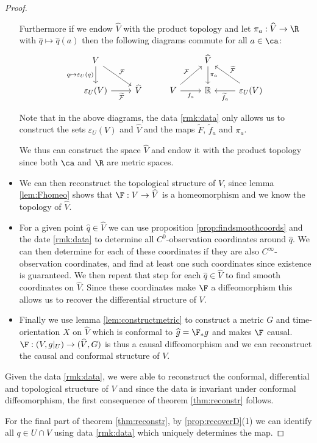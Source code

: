 \begin{proof}
\begin{itemize}
    Furthermore if we endow $\widehat{V}$ with the product topology and let $\pi_a:\widehat{V}\to \R$ with $\widehat{q}\mapsto \widehat{q}(a)$ then the following diagrams commute for all $a\in \ca$:
    \[\begin{tikzcd}
	V &&& {\widehat{V}} \\
	{\varepsilon_U(V)} & {\widehat{V}} & V & {\mathbb{R}} & {\varepsilon_U(V)}
	\arrow["{\mathcal{F}}", from=1-1, to=2-2]
	\arrow["{\widetilde{\mathcal{F}}}"', from=2-1, to=2-2]
	\arrow["{q\mapsto\varepsilon_U(q)}"', from=1-1, to=2-1]
	\arrow["{f_a}"', from=2-3, to=2-4]
	\arrow["{\widetilde{f}_a}", from=2-5, to=2-4]
	\arrow["{\mathcal{F}}", from=2-3, to=1-4]
	\arrow["{\widetilde{\mathcal{F}}}"', from=2-5, to=1-4]
	\arrow["{\pi_a}", from=1-4, to=2-4]
\end{tikzcd}\]

Note that in the above diagrams, the data \ref{rmk:data} only allows us to construct the sets $\varepsilon_U(V)$ and $\widehat{V}$ and the maps $\widetilde{F}$, $\widetilde{f}_a$ and $\pi_a$.

We thus can construct the space $\widehat{V}$ and endow it with the product topology since both $\ca$ and $\R$ are metric spaces.

\item We can then reconstruct the topological structure of $V$, since lemma \ref{lem:Fhomeo} shows that $\F:V\to\widehat{V}$ is a homeomorphism and we know the topology of $\widehat{V}$.

\item For a given point $\widehat{q}\in \widehat{V}$ we can use proposition \ref{prop:findsmoothcoords} and the date \ref{rmk:data} to determine all $C^0$-observation coordinates around $\widehat{q}$. We can then determine for each of these coordinates if they are also $C^\infty$-observation coordinates, and find at least one such coordinates since existence is guaranteed. We then repeat that step for each $\widehat{q}\in \widehat{V}$ to find smooth coordinates on $\widehat{V}$. Since these coordinates make $\F$ a diffeomorphism this allows us to recover the differential structure of $V$.

\item Finally we use lemma \ref{lem:constructmetric} to construct a metric $G$ and time-orientation $X$ on $\widehat{V}$ which is conformal to $\widehat{g}=\F_*g$ and makes $\F$ causal. 
$\F:(V,g\rvert_U)\to (\widehat{V},G)$ is thus a causal diffeomorphism and we can reconstruct the causal and conformal structure of $V$.
\end{itemize}

Given the data \ref{rmk:data}, we were able to reconstruct the conformal, differential and topological structure of $V$ and since the data is invariant under conformal diffeomorphism, the first consequence of theorem \ref{thm:reconstr} follows.

For the final part of theorem \ref{thm:reconstr}, by \ref{prop:recoverD}(1) we can identify all $q\in U\cap V$ using data \ref{rmk:data} which uniquely determines the map.
\end{proof}


